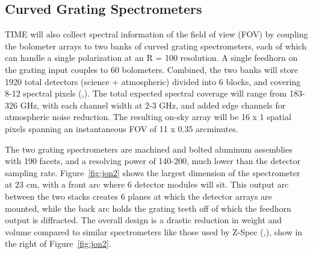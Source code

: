 \documentclass[manuscript]{aastex}
\begin{document}
\subsection{\textbf{Curved Grating Spectrometers}}
TIME will also collect spectral information of the field of view (FOV) by coupling the bolometer arrays to two banks of curved grating spectrometers, each of which can handle a single polarization at an R = 100 resolution. A single feedhorn on the grating input couples to 60 bolometers. Combined, the two banks will store 1920 total detectors (science + atmospheric) divided into 6 blocks, and covering 8-12 spectral pixels  (\cite{Crites2014},\cite{Hunacek2016}). The total expected spectral coverage will range from 183-326 GHz, with each channel width at 2-3 GHz, and added edge channels for atmospheric noise reduction. The resulting on-sky array will be 16 x 1 spatial pixels spanning an instantaneous FOV of 11 x 0.35 arcminutes.

The two grating spectrometers are machined and bolted aluminum assemblies with 190 facets, and a resolving power of 140-200, much lower than the detector sampling rate. Figure~\ref{fig:jon2} shows the largest dimension of the spectrometer at 23 cm, with a front arc where 6 detector modules will sit. This output arc between the two stacks creates 6 planes at which the detector arrays are mounted, while the back arc holds the grating teeth off of which the feedhorn output is diffracted. The overall design is a drastic reduction in weight and volume compared to similar spectrometers like those used by Z-Spec (\cite{Bradford2004},\cite{Naylor2003}), show in the right of Figure~\ref{fig:jon2}.
\end{document}
